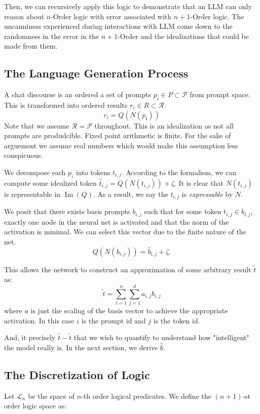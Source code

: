 \documentclass[12pt]{article}
\begin{document}
Then, we can recursively apply this logic to demonstrate that an LLM can
only reason about $n$-Order logic with error associated with $n+1$-Order logic.
The uncanniness experienced during interactions with LLM come down to the
randomness in the error in the $n+1$-Order and the idealizations that could
be made from them.

\subsection{The Language Generation Process}

A chat discourse is an ordered a set of prompts $p_i\in P \subset \mathcal{P}$ from
prompt space.  This is transformed into ordered results $r_i \in R \subset \mathcal{R}$.
$$
r_i = Q ( N ( p_i ) )
$$
Note that we assume $\mathcal{R} = \mathcal{P}$ throughout.  This is an idealization
as not all prompts are produdcible.  Fixed point arithmetic is finite.  For the sake
of arguement we assume real numbers which would make this assumption less conspicuous.

We decompose each $p_i$ into tokens $t_{i,j}$.  According to the formalism,
we can compute some idealized token $\hat{t}_{i,j} = Q(N(t_{i,j})) + \zeta.$
It is clear that $N(t_{i,j})$ is representable in $\operatorname{Im}(Q)$.  As a result,
we say the $t_{i,j}$ is \emph{expressable} by $N$.  

We posit that there exists basis prompts $b_{i,j}$ such that for some token $t_{i,j} \in b_{i,j}$,
exactly one node in the neural net is activated and that the norm of the activation is
minimal.  We can select this vector due to the finite nature of the net.
$$
Q(N(b_{i,j})) = \hat{b}_{i,j} + \zeta.
$$

This allows the network to construct an approximation of some arbitrary result $\tilde{t}$ as:
$$
\tilde{t} = \sum_{i=1}^n \sum_{j=1}^d a_{i,j}b_{i,j}
$$
where $a$ is just the scaling of the basis vector to achieve the appropriate activation. In this
case $i$ is the prompt id and $j$ is the token id.

And, it precisely $\hat{t} - \tilde{t}$ that we wish to quantify to understand how "intelligent"
the model really is.  In the next section, we derive $\hat{b}$.

\subsection{The Discretization of Logic}

Let $\mathcal{L}_n$ be the space of $n$-th order logical predicates. We define
the $(n{+}1)$-st order logic space as:
\end{document}
